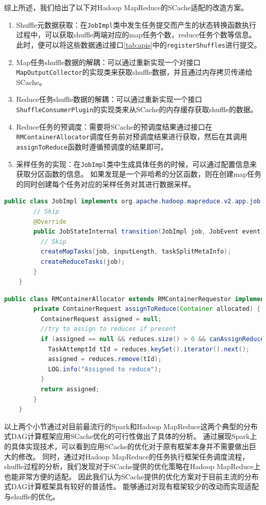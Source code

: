综上所述，我们给出了以下对Hadoop MapReduce的SCache适配的改造方案。
\begin{enumerate}
    \item Shuffle元数据获取：在\verb|JobImpl|类中发生任务提交而产生的状态转换函数执行过程中，可以获取shuffle两端对应的map任务个数，reduce任务个数等信息。
    此时，便可以将这些数据通过接口\ref{tab:apis}中的\verb|registerShuffles|进行提交。
    \item Map任务shuffle数据的解耦：可以通过重新实现一个对接口\verb|MapOutputCollector|的实现类来获取shuffle数据，并且通过内存拷贝传递给SCache。
    \item Reduce任务shuffle数据的解耦：可以通过重新实现一个接口\verb|ShuffleConsumerPlugin|的实现类来从SCache的内存缓存获取shuffle的数据。
    \item Reduce任务的预调度：需要将SCache的预调度结果通过接口在\verb|RMContainerAllocator|调度任务前对预调度结果进行获取，然后在其调用\verb|assignToReduce|函数时遵循预调度的结果即可。
    \item 采样任务的实现：在\verb|JobImpl|类中生成具体任务的时候，可以通过配置信息来获取分区函数的信息。
    如果发现是一个非哈希的分区函数，则在创建map任务的同时创建每个任务对应的采样任务对其进行数据采样。
\end{enumerate}

\begin{lstlisting}[language={Java}, caption={Hadoop MapReduce中shuffle元数据生成代码片段}, label={code:hadoopshuffle}]
    public class JobImpl implements org.apache.hadoop.mapreduce.v2.app.job.Job, EventHandler<JobEvent> {
        // Skip
        @Override
        public JobStateInternal transition(JobImpl job, JobEvent event) {
          // Skip
          createMapTasks(job, inputLength, taskSplitMetaInfo);
          createReduceTasks(job);
        }
    }
\end{lstlisting}

\begin{lstlisting}[language={Java}, caption={Hadoop MapReduce中reduce任务调度代码片段}, label={code:hadoopschedule}]
    public class RMContainerAllocator extends RMContainerRequestor implements ContainerAllocator {
        private ContainerRequest assignToReduce(Container allocated) {
          ContainerRequest assigned = null;
          //try to assign to reduces if present
          if (assigned == null && reduces.size() > 0 && canAssignReduces()) {
            TaskAttemptId tId = reduces.keySet().iterator().next();
            assigned = reduces.remove(tId);
            LOG.info("Assigned to reduce");
          }
          return assigned;
        }
    }
\end{lstlisting}

以上两个小节通过对目前最流行的Spark和Hadoop MapReduce这两个典型的分布式DAG计算框架应用SCache优化的可行性做出了具体的分析。
通过展现Spark上的具体实现技术，可以看到应用SCache的优化对于原有框架本身并不需要做出巨大的修改。
同时，通过对Hadoop MapReduce的任务执行框架任务调度流程，shuffle过程的分析，我们发现对于SCache提供的优化策略在Hadoop MapReduce上也能非常方便的适配。
因此我们认为SCache提供的优化方案对于目前主流的分布式DAG计算框架具有较好的普适性。
能够通过对现有框架较少的改动而实现适配与shuffle的优化。